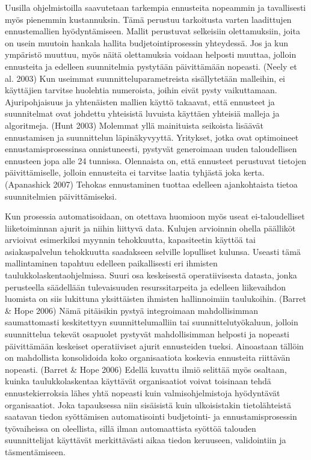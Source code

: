 \documentclass[12pt,a4paper,oneside,pdftex]{report}
\begin{document}
Uusilla ohjelmistoilla saavutetaan tarkempia ennusteita nopeammin ja tavallisesti myös pienemmin kustannuksin. Tämä perustuu tarkoitusta varten laadittujen ennustemallien hyödyntämiseen. Mallit perustuvat selkeisiin olettamuksiin, joita on usein muutoin hankala hallita budjetointiprosessin yhteydessä. Jos ja kun ympäristö muuttuu, myös näitä olettamuksia voidaan helposti muuttaa, jolloin ennusteita ja edelleen suunnitelmia pystytään päivittämään nopeasti. (Neely et al. 2003) Kun useimmat suunnitteluparametreista sisällytetään malleihin, ei käyttäjien tarvitse huolehtia numeroista, joihin eivät pysty vaikuttamaan. Ajuripohjaisuus ja yhtenäisten mallien käyttö takaavat, että ennusteet ja suunnitelmat ovat johdettu yhteisistä luvuista käyttäen yhteisiä malleja ja algoritmeja. (Hunt 2003) Molemmat yllä mainituista seikoista lisäävät ennustamisen ja suunnittelun läpinäkyvyyttä. Yritykset, jotka ovat optimoineet ennustamisprosessinsa onnistuneesti, pystyvät generoimaan uuden taloudellisen ennusteen jopa alle 24 tunnissa. Olennaista on, että ennusteet perustuvat tietojen päivittämiselle, jolloin ennusteita ei tarvitse laatia tyhjästä joka kerta. (Apanashick 2007) Tehokas ennustaminen tuottaa edelleen ajankohtaista tietoa suunnitelmien päivittämiseksi.

Kun prosessia automatisoidaan, on otettava huomioon myös useat ei-taloudelliset liiketoiminnan ajurit ja niihin liittyvä data. Kulujen arvioinnin ohella päälliköt arvioivat esimerkiksi myynnin tehokkuutta, kapasiteetin käyttöä tai asiakaspalvelun tehokkuutta saadakseen selville lopulliset kulunsa. Useasti tämä mallintaminen tapahtuu edelleen paikallisesti eri ihmisten taulukkolaskentaohjelmissa. Suuri osa keskeisestä operatiivisesta datasta, jonka perusteella säädellään tulevaisuuden resurssitarpeita ja edelleen liikevaihdon luomista on siis lukittuna yksittäisten ihmisten hallinnoimiin taulukoihin. (Barret & Hope 2006) Nämä pitäisikin pystyä integroimaan mahdollisimman saumattomasti keskitettyyn suunnittelumalliin tai suunnittelutyökaluun, jolloin suunnittelua tekevät osapuolet pystyvät mahdollisimman helposti ja nopeasti päivittämään keskeiset operatiiviset ajurit ennusteiden tueksi. Ainoastaan tällöin on mahdollista konsolidoida koko organisaatiota koskevia ennusteita riittävän nopeasti. (Barret & Hope 2006) Edellä kuvattu ilmiö selittää myös osaltaan, kuinka taulukkolaskentaa käyttävät organisaatiot voivat toisinaan tehdä ennustekierroksia lähes yhtä nopeasti kuin valmisohjelmistoja hyödyntävät organisaatiot. Joka tapauksessa niin sisäisistä kuin ulkoisistakin tietolähteistä saatavan tiedon syöttämisen automatisointi budjetointi- ja ennustamisprosessin työvaiheissa on oleellista, sillä ilman automaattista syöttöä talouden suunnittelijat käyttävät merkittävästi aikaa tiedon keruuseen, validointiin ja täsmentämiseen.
\end{document}
